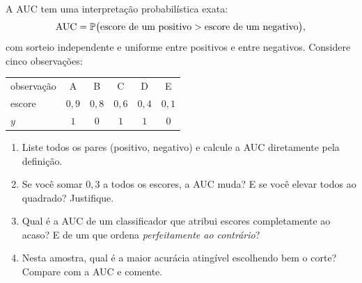 \documentclass[11pt,a4paper]{article}
\begin{document}
\begin{exercicio}
A AUC tem uma interpretação probabilística exata:
\[
  \mathrm{AUC} = \mathbb{P}\big(\text{escore de um positivo} > \text{escore de um negativo}\big),
\]
com sorteio independente e uniforme entre positivos e entre negativos. Considere
cinco observações:
\begin{center}\small
\renewcommand{\arraystretch}{1.2}
\begin{tabular}{@{}lccccc@{}}
\toprule
observação & A & B & C & D & E \\
escore     & $0{,}9$ & $0{,}8$ & $0{,}6$ & $0{,}4$ & $0{,}1$ \\
$y$        & $1$ & $0$ & $1$ & $1$ & $0$ \\
\bottomrule
\end{tabular}
\end{center}
\begin{enumerate}[label=(\alph*),leftmargin=1.1cm]
  \item Liste todos os pares (positivo, negativo) e calcule a AUC diretamente
        pela definição.
  \item Se você somar $0{,}3$ a todos os escores, a AUC muda? E se você elevar
        todos ao quadrado? Justifique.
  \item Qual é a AUC de um classificador que atribui escores completamente ao
        acaso? E de um que ordena \emph{perfeitamente ao contrário}?
  \item Nesta amostra, qual é a maior acurácia atingível escolhendo bem o corte?
        Compare com a AUC e comente.
\end{enumerate}
\end{exercicio}
\end{document}
